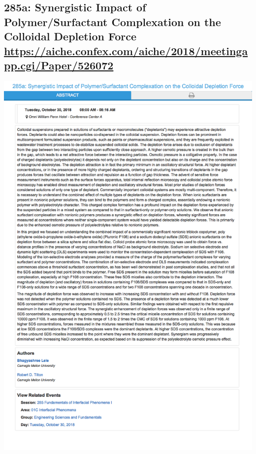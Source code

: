 \documentclass[11pt]{article}
\begin{document}
\subsection{285a: Synergistic Impact of Polymer/Surfactant Complexation on the Colloidal Depletion Force \url{https://aiche.confex.com/aiche/2018/meetingapp.cgi/Paper/526072}}
\label{sec:orge580860}
\begin{center}
\includegraphics[width=.9\linewidth]{./526072.png}
\end{center}
\end{document}
